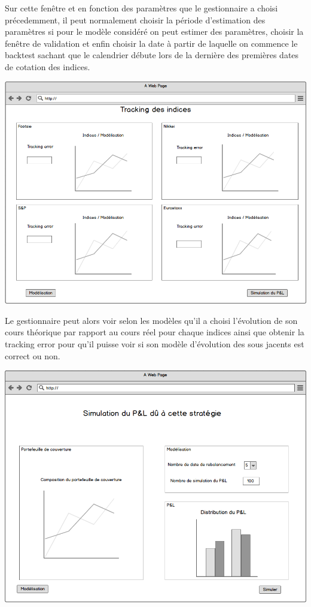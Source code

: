 \documentclass[french,12pt,a4paper]{article}
\begin{document}
 Sur cette fenêtre et en fonction des paramètres que le gestionnaire a choisi précedemment, il peut normalement choisir la période d'estimation des paramètres si pour le modèle considéré on peut estimer des paramètres, choisir la fenêtre de validation et enfin choisir la date à partir de laquelle on commence le backtest sachant que le calendrier débute lors de la dernière des premières dates de cotation des indices.

\begin{center}
\includegraphics[scale=0.4]{../Maquette_8.png}
\end{center}

Le gestionnaire peut alors voir selon les modèles qu'il a choisi l'évolution de son cours théorique par rapport au cours réel pour chaque indices ainsi que obtenir la tracking error pour qu'il puisse voir si son modèle d'évolution des sous jacents est correct ou non.

\begin{center}
\includegraphics[scale=0.4]{../Maquette_5.png}
\end{center}
\end{document}
